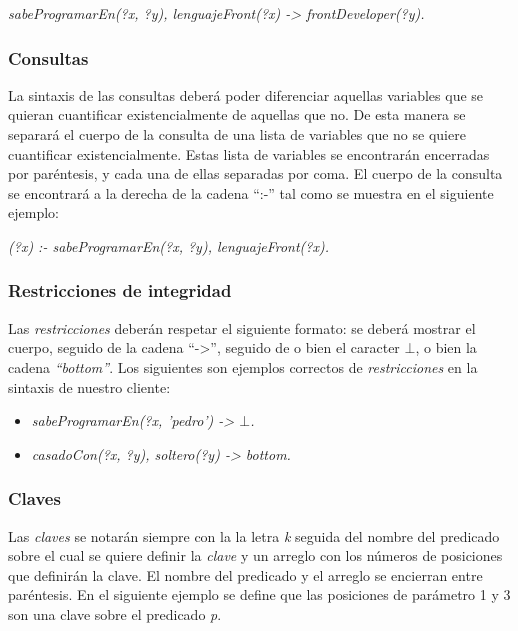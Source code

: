 \documentclass[11pt,a4paper,twoside]{tesis}
\begin{document}
\begin{center}
 \textit{sabeProgramarEn(?x, ?y), lenguajeFront(?x) ->  frontDeveloper(?y).}
\end{center}

\subsubsection{Consultas}

La sintaxis de las consultas deberá poder diferenciar aquellas variables que se quieran cuantificar existencialmente de aquellas que no. De esta manera se separará el cuerpo de la consulta de una lista de variables que no se quiere cuantificar existencialmente. Estas lista de variables se encontrarán encerradas por paréntesis, y cada una de ellas separadas por coma. El cuerpo de la consulta se encontrará a la derecha de la cadena ``:-'' tal como se muestra en el siguiente ejemplo:

\begin{center}
 \textit{(?x) :- sabeProgramarEn(?x, ?y), lenguajeFront(?x).}
\end{center}

\subsubsection{Restricciones de integridad}

Las \textit{restricciones} deberán respetar el siguiente formato: se deberá mostrar el cuerpo, seguido de la cadena ``->'', seguido de o bien el caracter $\bot$, o bien la cadena \textit{``bottom''}. Los siguientes son ejemplos correctos de \textit{restricciones} en la sintaxis de nuestro cliente:

\begin{itemize}
    \item \textit{sabeProgramarEn(?x, 'pedro') -> $\bot$.}
    \item \textit{casadoCon(?x, ?y), soltero(?y) -> bottom.}
\end{itemize}

\subsubsection{Claves}

Las \textit{claves} se notarán siempre con la la letra \textit{k} seguida del nombre del predicado sobre el cual se quiere definir la \textit{clave} y un arreglo con los números de posiciones que definirán la clave. El nombre del predicado y el arreglo se encierran entre paréntesis. En el siguiente ejemplo se define que las posiciones de parámetro 1 y 3 son una clave sobre el predicado \textit{p}.
\end{document}
